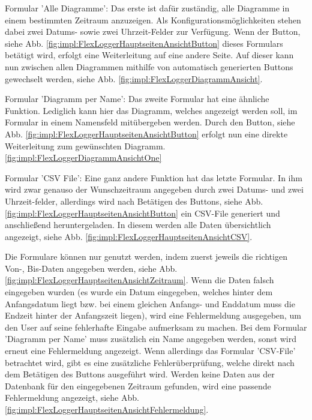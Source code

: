 \begin{compactitem}
\item Formular 'Alle Diagramme': Das erste ist dafür zuständig, alle Diagramme in einem bestimmten Zeitraum anzuzeigen. Als Konfigurationsmöglichkeiten stehen dabei zwei Datums- sowie zwei Uhrzeit-Felder zur Verfügung. Wenn der Button, siehe Abb. \ref{fig:impl:FlexLoggerHauptseitenAnsichtButton} dieses Formulars betätigt wird, erfolgt eine Weiterleitung auf eine andere Seite. Auf dieser kann nun zwischen allen Diagrammen mithilfe von automatisch generierten Buttons gewechselt werden, siehe Abb. \ref{fig:impl:FlexLoggerDiagrammAnsicht}.
\item Formular 'Diagramm per Name': Das zweite Formular hat eine ähnliche Funktion. Lediglich kann hier das Diagramm, welches angezeigt werden soll, im Formular in einem Namensfeld mitübergeben werden. Durch den Button, siehe Abb. \ref{fig:impl:FlexLoggerHauptseitenAnsichtButton} erfolgt nun eine direkte Weiterleitung zum gewünschten Diagramm. \ref{fig:impl:FlexLoggerDiagrammAnsichtOne}
\item Formular 'CSV File': Eine ganz andere Funktion hat das letzte Formular. In ihm wird zwar genauso der Wunschzeitraum angegeben durch zwei Datums- und zwei Uhrzeit-felder, allerdings wird nach Betätigen des Buttons, siehe Abb. \ref{fig:impl:FlexLoggerHauptseitenAnsichtButton} ein CSV-File generiert und anschließend heruntergeladen. In diesem werden alle Daten übersichtlich angezeigt, siehe Abb. \ref{fig:impl:FlexLoggerHauptseitenAnsichtCSV}.
\end{compactitem}








Die Formulare können nur genutzt werden, indem zuerst jeweils die richtigen Von-, Bis-Daten angegeben werden, siehe Abb. \ref{fig:impl:FlexLoggerHauptseitenAnsichtZeitraum}. Wenn die Daten falsch eingegeben wurden (es wurde ein Datum eingegeben, welches hinter dem Anfangsdatum liegt bzw. bei einem gleichen Anfangs- und Enddatum muss die Endzeit hinter der Anfangszeit liegen), wird eine Fehlermeldung ausgegeben, um den User auf seine fehlerhafte Eingabe aufmerksam zu machen. Bei dem Formular 'Diagramm per Name' muss zusätzlich ein Name angegeben werden, sonst wird erneut eine Fehlermeldung angezeigt. Wenn allerdings das Formular 'CSV-File' betrachtet wird, gibt es eine zusätzliche Fehlerüberprüfung, welche direkt nach dem Betätigen des Buttons ausgeführt wird. Werden keine Daten aus der Datenbank für den eingegebenen Zeitraum gefunden, wird eine passende Fehlermeldung angezeigt, siehe Abb. \ref{fig:impl:FlexLoggerHauptseitenAnsichtFehlermeldung}.


